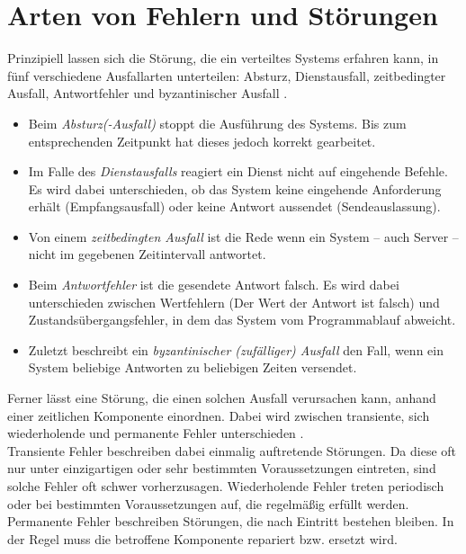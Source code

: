 \documentclass[12pt,a4paper,parskip=half]{scrreprt}
\begin{document}
	\section{Arten von Fehlern und Störungen}
	Prinzipiell lassen sich die Störung, die ein verteiltes Systems erfahren kann, in fünf verschiedene Ausfallarten unterteilen: Absturz, Dienstausfall, zeitbedingter Ausfall, Antwortfehler und byzantinischer Ausfall \cite{vS-Dillinger}\cite{vS-TU-Braunschweig}.
	\begin{itemize}
		\item Beim \textit{Absturz(-Ausfall)} stoppt die Ausführung des Systems. Bis zum entsprechenden Zeitpunkt hat dieses jedoch korrekt gearbeitet. %
		\item Im Falle des \textit{Dienstausfalls} reagiert ein Dienst nicht auf eingehende Befehle. Es wird dabei unterschieden, ob das System keine eingehende Anforderung erhält (Empfangsausfall) oder keine Antwort aussendet (Sendeauslassung).
		\item Von einem \textit{zeitbedingten Ausfall} ist die Rede wenn ein System -- auch Server -- nicht im gegebenen Zeitintervall antwortet.
		\item Beim \textit{Antwortfehler} ist die gesendete Antwort falsch. Es wird dabei unterschieden zwischen Wertfehlern (Der Wert der Antwort ist falsch) und Zustandsübergangsfehler, in dem das System vom Programmablauf abweicht.
		\item Zuletzt beschreibt ein \textit{byzantinischer (zufälliger) Ausfall} den Fall, wenn ein System beliebige Antworten zu beliebigen Zeiten versendet.
	\end{itemize}
	Ferner lässt eine Störung, die einen solchen Ausfall verursachen kann, anhand einer zeitlichen Komponente einordnen. Dabei wird zwischen transiente, sich wiederholende und permanente Fehler unterschieden \cite{vS-Dillinger}.\\
	Transiente Fehler beschreiben dabei einmalig auftretende Störungen. Da diese oft nur unter einzigartigen oder sehr bestimmten Voraussetzungen eintreten, sind solche Fehler oft schwer vorherzusagen. Wiederholende Fehler treten periodisch oder bei bestimmten Voraussetzungen auf, die regelmäßig erfüllt werden. Permanente Fehler beschreiben Störungen, die nach Eintritt bestehen bleiben. In der Regel muss die betroffene Komponente repariert bzw. ersetzt wird.
	
	
\end{document}
